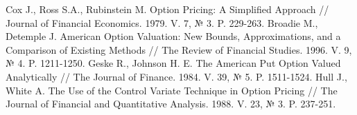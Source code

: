 \documentclass[oneside,final,12pt]{article}
\begin{document}
\newpage
{}
\begin{thebibliography}{}
	 	Cox J., Ross S.A., Rubinstein M. Option Pricing: A Simplified Approach // Journal of Financial Economics. 1979. V. 7, № 3. P. 229-263.
	 Broadie M., Detemple J. American Option Valuation: New Bounds, Approximations, and a Comparison of Existing Methods // The Review of Financial Studies. 1996. V. 9, № 4. P. 1211-1250.
     Geske R., Johnson H. E. The American Put Option Valued Analytically // The Journal of Finance. 1984. V. 39, № 5. P. 1511-1524.
     Hull J., White A. The Use of the Control Variate Technique in Option Pricing // The Journal of Financial and Quantitative Analysis. 1988. V. 23, № 3. P. 237-251.
\end{thebibliography}
\end{document}
